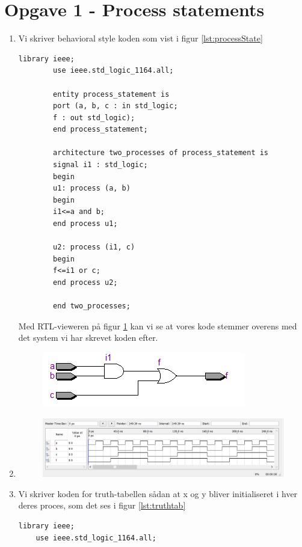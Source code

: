\section{Opgave 1 - Process statements}
\begin{enumerate}
	\item[1)]
	Vi skriver behavioral style koden som vist i figur \ref{lst:processState}
		
		\begin{lstlisting}[caption={Behavioral style kode for en AND og OR gate},label={lst:processState}]
		library ieee;
		use ieee.std_logic_1164.all;
		
		entity process_statement is 
		port (a, b, c : in std_logic;
		f : out std_logic);
		end process_statement;
		
		architecture two_processes of process_statement is
		signal i1 : std_logic;
		begin
		u1: process (a, b)
		begin
		i1<=a and b;
		end process u1;
		
		u2: process (i1, c)
		begin
		f<=i1 or c;
		end process u2;
		
		end two_processes;
		\end{lstlisting}
		Med RTL-vieweren på figur \ref{fig:RTL process}  kan vi se at vores kode stemmer overens med det system vi har skrevet koden efter.
		\begin{figure}[h]
			\centering
			\includegraphics[scale=0.8]{pictures/Oevelse5/opg1/RTL_process.JPG}
			\caption{}
			\label{fig:RTL process}
		\end{figure}
		\item[2)]
		\begin{figure}[h]
			\centering
			\includegraphics[scale=0.8]{pictures/Oevelse5/opg1/func_sim_process.JPG}
			\caption{}
			\label{fig:Functional simulation process koden}
		\end{figure}
	\item[3)]
	Vi skriver koden for truth-tabellen sådan at x og y bliver initialiseret i hver deres proces, som det ses i figur \ref{lst:truthtab} 
	\begin{lstlisting}[caption={Behavioral style kode for truth tabellen},label={lst:truthtab}]
	library ieee;
	use ieee.std_logic_1164.all;
	

\end{lstlisting}
\end{enumerate}
